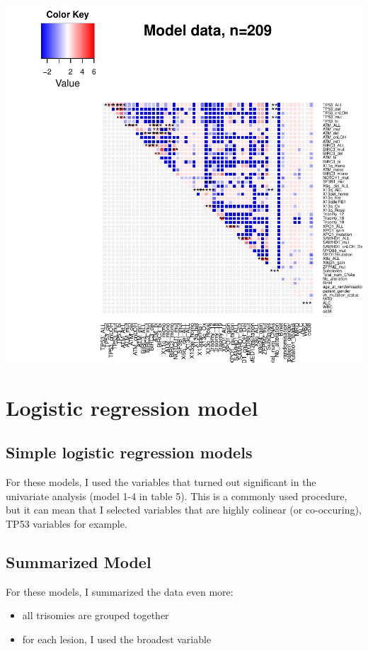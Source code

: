 \documentclass[a4paper,11pt]{article}
\begin{document}
\includegraphics{HICF1_Finalreportv1-013}

\section*{Logistic regression model}
\subsection*{Simple logistic regression models}
For these models, I used the variables that turned out significant in the univariate analysis (model 1-4 in table 5). This is a commonly used procedure, but it can mean that I selected variables that are highly colinear (or co-occuring), TP53 variables for example.
\subsection*{Summarized Model}
For these models, I summarized the data even more:
\begin{itemize}
  \item all trisomies are grouped together
  \item for each lesion, I used the broadest variable
\end{itemize}
\end{document}

